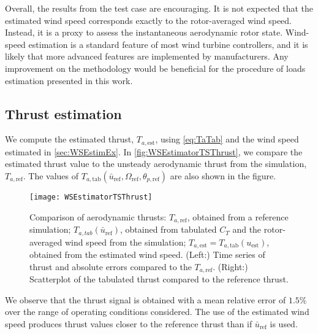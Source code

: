 \documentclass[wes, manuscript]{copernicus}
\begin{document}
% 
Overall, the results from the test case are encouraging. It is not expected that the estimated wind speed corresponds exactly to the rotor-averaged wind speed. Instead, it is a proxy to assess the instantaneous aerodynamic rotor state.
Wind-speed estimation is a standard feature of most wind turbine controllers, and it is likely that more advanced features are implemented by manufacturers.
Any improvement on the methodology would be beneficial for the procedure of loads estimation presented in this work.






\subsection{Thrust estimation}
\label{sec:ThrustEstimEx}
We compute the estimated thrust, $T_{a,\text{est}}$, using \autoref{eq:TaTab} and the wind speed estimated in \autoref{sec:WSEstimEx}.
In \autoref{fig:WSEstimatorTSThrust}, we compare the estimated thrust value to the unsteady aerodynamic thrust from the simulation, $T_{a,\text{ref}}$.
The values of $T_{a,\text{tab}}(\bar{u}_\text{ref},\Omega_\text{ref},\theta_{p,\text{ref}})$ are also shown in the figure.
% 
\noindent\begin{figure}[!htb]\centering%
  \texttt{[image: WSEstimatorTSThrust]}
  \caption{Comparison of aerodynamic thrusts: $T_{a,\text{ref}}$, obtained from a reference simulation; $T_{a,tab}(\bar{u}_\text{ref})$, obtained from tabulated $C_T$ and the rotor-averaged wind speed from the simulation; $T_{a,\text{est}}=T_{a,\text{tab}}(u_\text{est})$, obtained from the estimated wind speed. (Left:) Time series of thrust and absolute errors compared to the $T_{a,\text{ref}}$. (Right:) Scatterplot of the tabulated thrust compared to the reference thrust.  }\label{fig:WSEstimatorTSThrust}%
\end{figure}
% 
We observe that the thrust signal is obtained with a mean relative error of $1.5\%$ over the range of operating conditions considered. 
The use of the estimated wind speed produces thrust values closer to the reference thrust than if $\bar{u}_\text{ref}$ is used.
\end{document}
